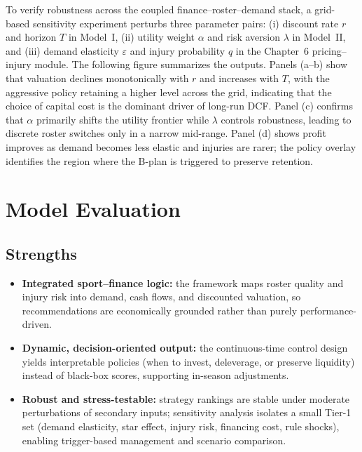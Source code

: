 \documentclass[12pt]{article}
\numberwithin{figure}{section}
\numberwithin{table}{section}
\begin{document}
	To verify robustness across the coupled finance--roster--demand stack, a grid-based sensitivity experiment perturbs three parameter pairs: (i) discount rate $r$ and horizon $T$ in Model~I, (ii) utility weight $\alpha$ and risk aversion $\lambda$ in Model~II, and (iii) demand elasticity $\varepsilon$ and injury probability $q$ in the Chapter~6 pricing--injury module. The following figure summarizes the outputs. Panels (a--b) show that valuation declines monotonically with $r$ and increases with $T$, with the aggressive policy retaining a higher level across the grid, indicating that the choice of capital cost is the dominant driver of long-run DCF. Panel (c) confirms that $\alpha$ primarily shifts the utility frontier while $\lambda$ controls robustness, leading to discrete roster switches only in a narrow mid-range. Panel (d) shows profit improves as demand becomes less elastic and injuries are rarer; the policy overlay identifies the region where the B-plan is triggered to preserve retention.
	
	
	
	\section{Model Evaluation}
	
	\subsection{Strengths}
	\begin{itemize}\setlength\itemsep{0.2em}
		\item \textbf{Integrated sport--finance logic:} the framework maps roster quality and injury risk into demand, cash flows, and discounted valuation, so recommendations are economically grounded rather than purely performance-driven.
		\item \textbf{Dynamic, decision-oriented output:} the continuous-time control design yields interpretable policies (when to invest, deleverage, or preserve liquidity) instead of black-box scores, supporting in-season adjustments.
		\item \textbf{Robust and stress-testable:} strategy rankings are stable under moderate perturbations of secondary inputs; sensitivity analysis isolates a small Tier-1 set (demand elasticity, star effect, injury risk, financing cost, rule shocks), enabling trigger-based management and scenario comparison.
	\end{itemize}
	
\end{document}
